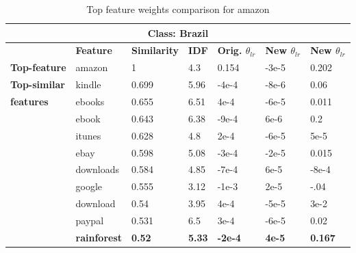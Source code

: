 \begin{table}[htbp]
\centering
\begin{tabular}{lllllll}
\multicolumn{7}{c}{\textbf{Class: Brazil}} \\ \hline
\multicolumn{1}{l|}{\textbf{}} & \multicolumn{1}{l|}{\textbf{Feature}} & \multicolumn{1}{l|}{\textbf{Similarity}} & \multicolumn{1}{l|}{\textbf{IDF}} & \multicolumn{1}{l|}{\textbf{Orig. $\theta_{lr}$}} & \multicolumn{1}{l|}{\textbf{New $\theta_{lr}$}} & \textbf{New $\theta_{lr}$} \\ \hline
\multicolumn{1}{l|}{\textbf{Top-feature}} & \multicolumn{1}{l|}{amazon} & \multicolumn{1}{l|}{1} & \multicolumn{1}{l|}{4.3} & \multicolumn{1}{l|}{0.154} & \multicolumn{1}{l|}{-3e-5} & 0.202 \\ \hline
\multicolumn{1}{l|}{\textbf{Top-similar}} & \multicolumn{1}{l|}{kindle} & \multicolumn{1}{l|}{0.699} & \multicolumn{1}{l|}{5.96} & \multicolumn{1}{l|}{-4e-4} & \multicolumn{1}{l|}{-8e-6} & 0.06 \\
\multicolumn{1}{l|}{\textbf{features}} & \multicolumn{1}{l|}{ebooks} & \multicolumn{1}{l|}{0.655} & \multicolumn{1}{l|}{6.51} & \multicolumn{1}{l|}{4e-4} & \multicolumn{1}{l|}{-6e-5} & 0.011 \\
\multicolumn{1}{l|}{} & \multicolumn{1}{l|}{ebook} & \multicolumn{1}{l|}{0.643} & \multicolumn{1}{l|}{6.38} & \multicolumn{1}{l|}{-9e-4} & \multicolumn{1}{l|}{6e-6} & 0.2 \\
\multicolumn{1}{l|}{\textbf{}} & \multicolumn{1}{l|}{itunes} & \multicolumn{1}{l|}{0.628} & \multicolumn{1}{l|}{4.8} & \multicolumn{1}{l|}{2e-4} & \multicolumn{1}{l|}{-6e-5} & 5e-5 \\
\multicolumn{1}{l|}{} & \multicolumn{1}{l|}{ebay} & \multicolumn{1}{l|}{0.598} & \multicolumn{1}{l|}{5.08} & \multicolumn{1}{l|}{-3e-4} & \multicolumn{1}{l|}{-2e-5} & 0.015 \\
\multicolumn{1}{l|}{} & \multicolumn{1}{l|}{downloads} & \multicolumn{1}{l|}{0.584} & \multicolumn{1}{l|}{4.85} & \multicolumn{1}{l|}{-7e-4} & \multicolumn{1}{l|}{6e-5} & -8e-4 \\
\multicolumn{1}{l|}{\textbf{}} & \multicolumn{1}{l|}{google} & \multicolumn{1}{l|}{0.555} & \multicolumn{1}{l|}{3.12} & \multicolumn{1}{l|}{-1e-3} & \multicolumn{1}{l|}{2e-5} & -.04 \\
\multicolumn{1}{l|}{} & \multicolumn{1}{l|}{download} & \multicolumn{1}{l|}{0.54} & \multicolumn{1}{l|}{3.95} & \multicolumn{1}{l|}{4e-4} & \multicolumn{1}{l|}{-5e-5} & 3e-2 \\
\multicolumn{1}{l|}{} & \multicolumn{1}{l|}{paypal} & \multicolumn{1}{l|}{0.531} & \multicolumn{1}{l|}{6.5} & \multicolumn{1}{l|}{3e-4} & \multicolumn{1}{l|}{-6e-5} & 0.02 \\
\multicolumn{1}{l|}{\textbf{}} & \multicolumn{1}{l|}{\textbf{rainforest}} & \multicolumn{1}{l|}{\textbf{0.52}} & \multicolumn{1}{l|}{\textbf{5.33}} & \multicolumn{1}{l|}{\textbf{-2e-4}} & \multicolumn{1}{l|}{\textbf{4e-5}} & \textbf{0.167}
\end{tabular}
\caption{\label{tab:widgets}Top feature weights comparison for amazon}
\end{table}

